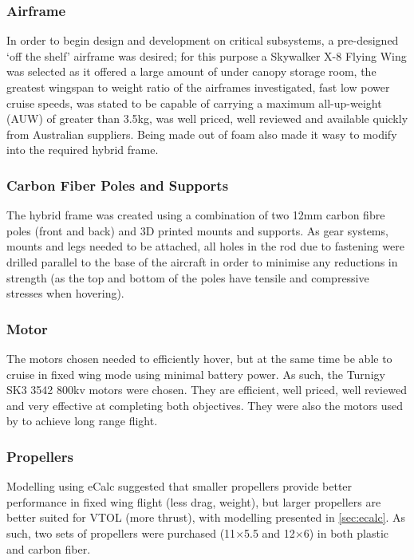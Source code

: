 \subsubsection*{Airframe}
In order to begin design and development on critical subsystems, a pre-designed `off the shelf' airframe was desired; for this purpose a Skywalker X-8 Flying Wing was selected as it offered a large amount of under canopy storage room, the greatest wingspan to weight ratio of the airframes investigated, fast low power cruise speeds, was stated to be capable of carrying a maximum all-up-weight (AUW) of greater than 3.5kg, was well priced, well reviewed and available quickly from Australian suppliers. Being made out of foam also made it wasy to modify into the required hybrid frame.
		
		
\subsubsection*{Carbon Fiber Poles and Supports}
The hybrid frame was created using a combination of two 12mm carbon fibre poles (front and back) and 3D printed mounts and supports. As gear systems, mounts and legs needed to be attached, all holes in the rod due to fastening were drilled parallel to the base of the aircraft in order to minimise any reductions in strength (as the top and bottom of the poles have tensile and compressive stresses when hovering).
	
\subsubsection*{Motor}
The motors chosen needed to efficiently hover, but at the same time be able to cruise in fixed wing mode using minimal battery power. As such, the Turnigy SK3 3542 800kv motors were chosen. They are efficient, well priced, well reviewed and very effective at completing both objectives. They were also the motors used by  to achieve long range flight.
	
\subsubsection*{Propellers}
Modelling using eCalc suggested that smaller propellers provide better performance in fixed wing flight (less drag, weight), but larger propellers are better suited for VTOL (more thrust), with modelling presented in \ref{sec:ecalc}. As such, two sets of propellers were purchased (11$\times$5.5 and 12$\times$6) in both plastic and carbon fiber.
	
